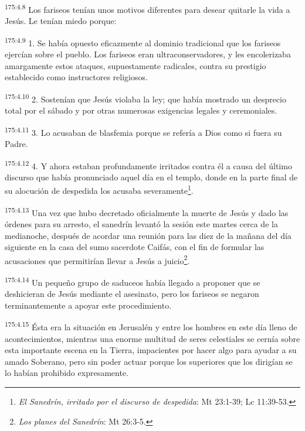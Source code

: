 \par 
\textsuperscript{175:4.8} Los fariseos tenían unos motivos diferentes para desear quitarle la vida a Jesús. Le tenían miedo porque:

\par 
\textsuperscript{175:4.9} 1. Se había opuesto eficazmente al dominio tradicional que los fariseos ejercían sobre el pueblo. Los fariseos eran ultraconservadores, y les encolerizaba amargamente estos ataques, supuestamente radicales, contra su prestigio establecido como instructores religiosos.

\par 
\textsuperscript{175:4.10} 2. Sostenían que Jesús violaba la ley; que había mostrado un desprecio total por el sábado y por otras numerosas exigencias legales y ceremoniales.

\par 
\textsuperscript{175:4.11} 3. Lo acusaban de blasfemia porque se refería a Dios como si fuera su Padre.

\par 
\textsuperscript{175:4.12} 4. Y ahora estaban profundamente irritados contra él a causa del último discurso que había pronunciado aquel día en el templo, donde en la parte final de su alocución de despedida los acusaba severamente\footnote{\textit{El Sanedrín, irritado por el discurso de despedida}: Mt 23:1-39; Lc 11:39-53.}.

\par 
\textsuperscript{175:4.13} Una vez que hubo decretado oficialmente la muerte de Jesús y dado las órdenes para su arresto, el sanedrín levantó la sesión este martes cerca de la medianoche, después de acordar una reunión para las diez de la mañana del día siguiente en la casa del sumo sacerdote Caifás, con el fin de formular las acusaciones que permitirían llevar a Jesús a juicio\footnote{\textit{Los planes del Sanedrín}: Mt 26:3-5.}.

\par 
\textsuperscript{175:4.14} Un pequeño grupo de saduceos había llegado a proponer que se deshicieran de Jesús mediante el asesinato, pero los fariseos se negaron terminantemente a apoyar este procedimiento.

\par 
\textsuperscript{175:4.15} Ésta era la situación en Jerusalén y entre los hombres en este día lleno de acontecimientos, mientras una enorme multitud de seres celestiales se cernía sobre esta importante escena en la Tierra, impacientes por hacer algo para ayudar a su amado Soberano, pero sin poder actuar porque los superiores que los dirigían se lo habían prohibido expresamente.